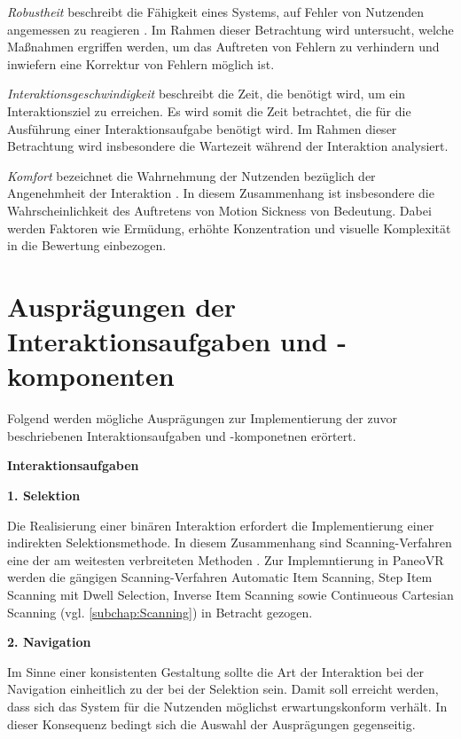 \textit{Robustheit} beschreibt die Fähigkeit eines Systems, auf Fehler von Nutzenden angemessen zu reagieren \citep{DINISO9241-110}. Im Rahmen dieser Betrachtung wird untersucht, welche Maßnahmen ergriffen werden, um das Auftreten von Fehlern zu verhindern und inwiefern eine Korrektur von Fehlern möglich ist.

\textit{Interaktionsgeschwindigkeit} beschreibt die Zeit, die benötigt wird, um ein Interaktionsziel zu erreichen. Es wird somit die Zeit betrachtet, die für die Ausführung einer Interaktionsaufgabe benötigt wird. Im Rahmen dieser Betrachtung wird insbesondere die Wartezeit während der Interaktion analysiert.  

\textit{Komfort} bezeichnet die Wahrnehmung der Nutzenden bezüglich der Angenehmheit der Interaktion \citep{jerald_vr_2016}. In diesem Zusammenhang ist insbesondere die Wahrscheinlichkeit des Auftretens von Motion Sickness von Bedeutung. Dabei werden Faktoren wie Ermüdung, erhöhte Konzentration und visuelle Komplexität in die Bewertung einbezogen.

\section{Ausprägungen der Interaktionsaufgaben und -komponenten}

Folgend werden mögliche Ausprägungen zur Implementierung der zuvor beschriebenen Interaktionsaufgaben und -komponetnen erörtert.

{\normalfont \bfseries Interaktionsaufgaben}  

\textbf{1. Selektion} 

Die Realisierung einer binären Interaktion erfordert die Implementierung einer indirekten Selektionsmethode. In diesem Zusammenhang sind Scanning-Verfahren eine der am weitesten verbreiteten Methoden \citep{COOK2015117}. Zur Implemntierung in PaneoVR werden die gängigen Scanning-Verfahren Automatic Item Scanning, Step Item Scanning mit Dwell Selection, Inverse Item Scanning sowie Continueous Cartesian Scanning (vgl. \autoref{subchap:Scanning}) in Betracht gezogen. 

\textbf{2. Navigation}

Im Sinne einer konsistenten Gestaltung sollte die Art der Interaktion bei der Navigation einheitlich zu der bei der Selektion sein. Damit soll erreicht werden, dass sich das System für die Nutzenden möglichst erwartungskonform verhält. In dieser Konsequenz bedingt sich die Auswahl der Ausprägungen gegenseitig.

